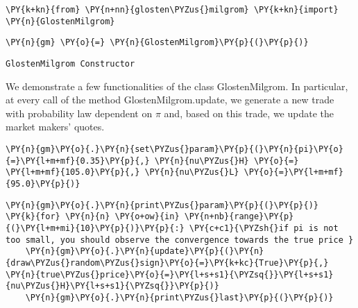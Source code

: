 \documentclass[9pt]{article}
\begin{document}
    \begin{tcolorbox}[breakable, size=fbox, boxrule=1pt, pad at break*=1mm,colback=cellbackground, colframe=cellborder]
\begin{Verbatim}[commandchars=\\\{\}]
\PY{k+kn}{from} \PY{n+nn}{glosten\PYZus{}milgrom} \PY{k+kn}{import} \PY{n}{GlostenMilgrom}
\end{Verbatim}
\end{tcolorbox}

    \begin{tcolorbox}[breakable, size=fbox, boxrule=1pt, pad at break*=1mm,colback=cellbackground, colframe=cellborder]
\begin{Verbatim}[commandchars=\\\{\}]
\PY{n}{gm} \PY{o}{=} \PY{n}{GlostenMilgrom}\PY{p}{(}\PY{p}{)}
\end{Verbatim}
\end{tcolorbox}

    \begin{Verbatim}[commandchars=\\\{\}]
GlostenMilgrom Constructor
    \end{Verbatim}

    We demonstrate a few functionalities of the class GlostenMilgrom. In
particular, at every call of the method GlostenMilgrom.update, we
generate a new trade with probability law dependent on \(\pi\) and,
based on this trade, we update the market makers' quotes.

    \begin{tcolorbox}[breakable, size=fbox, boxrule=1pt, pad at break*=1mm,colback=cellbackground, colframe=cellborder]
\begin{Verbatim}[commandchars=\\\{\}]
\PY{n}{gm}\PY{o}{.}\PY{n}{set\PYZus{}param}\PY{p}{(}\PY{n}{pi}\PY{o}{=}\PY{l+m+mf}{0.35}\PY{p}{,} \PY{n}{nu\PYZus{}H} \PY{o}{=} \PY{l+m+mf}{105.0}\PY{p}{,} \PY{n}{nu\PYZus{}L} \PY{o}{=}\PY{l+m+mf}{95.0}\PY{p}{)}
\end{Verbatim}
\end{tcolorbox}

    \begin{tcolorbox}[breakable, size=fbox, boxrule=1pt, pad at break*=1mm,colback=cellbackground, colframe=cellborder]
\begin{Verbatim}[commandchars=\\\{\}]
\PY{n}{gm}\PY{o}{.}\PY{n}{print\PYZus{}param}\PY{p}{(}\PY{p}{)}
\PY{k}{for} \PY{n}{n} \PY{o+ow}{in} \PY{n+nb}{range}\PY{p}{(}\PY{l+m+mi}{10}\PY{p}{)}\PY{p}{:} \PY{c+c1}{\PYZsh{}if pi is not too small, you should observe the convergence towards the true price }
    \PY{n}{gm}\PY{o}{.}\PY{n}{update}\PY{p}{(}\PY{n}{draw\PYZus{}random\PYZus{}sign}\PY{o}{=}\PY{k+kc}{True}\PY{p}{,} \PY{n}{true\PYZus{}price}\PY{o}{=}\PY{l+s+s1}{\PYZsq{}}\PY{l+s+s1}{nu\PYZus{}H}\PY{l+s+s1}{\PYZsq{}}\PY{p}{)}
    \PY{n}{gm}\PY{o}{.}\PY{n}{print\PYZus{}last}\PY{p}{(}\PY{p}{)}
\end{Verbatim}
\end{tcolorbox}
\end{document}
